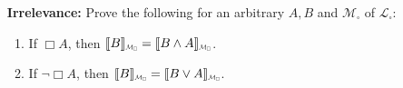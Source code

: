 \documentclass[a4paper, 11pt]{article} %
\newcommand{\interpret}[1]{\llbracket#1\rrbracket} %
\newcommand*{\Scale}[2][4]{\scalebox{#1}{$#2$}}%
\begin{document}
\begin{enumerate}[leftmargin=1.2in,labelsep=.15in]
\begin{enumerate}[label=(\arabic*),resume]
	\end{enumerate}
\item[\bf Irrelevance:] Prove the following for an arbitrary $A,B$ and $\mathcal{M}_\square$ of $\mathcal{L}_\square$: 
	\begin{enumerate}[label=(\arabic*),resume]\small
	\item If $\Box A$, then $\interpret{B}_{\Scale[0.5]{\mathcal{M}_\square}}=\interpret{B\wedge A}_{\Scale[0.5]{\mathcal{M}_\square}}$.
	\item If $\neg\Box A$, then $\interpret{B}_{\Scale[0.5]{\mathcal{M}_\square}}=\interpret{B\vee A}_{\Scale[0.5]{\mathcal{M}_\square}}$.
	\end{enumerate}
\end{enumerate}


\vfill








\begin{small} %
\singlespacing %
\setlength{\bibsep}{0.5pt} %
\thispagestyle{empty} %
\end{small} %
\end{document}
